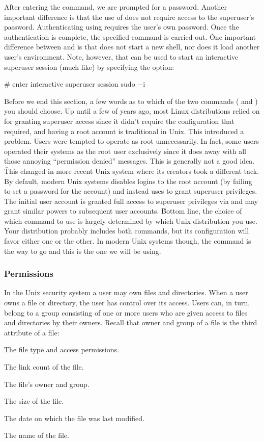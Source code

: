After entering the command, we are prompted for a password. Another important difference is that the use of  does not require access to the superuser's password. Authenticating using  requires the user's own
password. Once the authentication is complete, the specified command is carried out. \v

One important difference between  and  is that  does not start a new shell, nor does
it load another user's environment. Note, however, that  can be used to start an interactive superuser
session (much like) by specifying the  option:
\begin{bash}
# enter interactive superuser session
sudo $-$i
\end{bash}

Before we end this section, a few words as to which of the two commands ( and ) you should choose.
Up until a few of years ago, most Linux distributions relied on  for granting superuser access since it
didn't require the configuration that  required, and having a root account is traditional in Unix. This
introduced a problem. Users were tempted to operate as root unnecessarily. In fact, some users operated their systems
as the root user exclusively since it does away with all those annoying ``permission denied'' messages. This is
generally not a good idea. \v

This changed in more recent Unix system where its creators took a different tack. By default, modern Unix systems
disables logins to the root account (by failing to set a password for the account) and instead uses  to
grant superuser privileges. The initial user account is granted full access to superuser privileges via 
and may grant similar powers to subsequent user accounts. \v

Bottom line, the choice of which command to use is largely determined by which Unix distribution you use. Your
distribution probably includes both commands, but its configuration will favor either one or the other. In modern Unix
systems though, the  command is the way to go and this is the one we will be using.

\subsubsection{Permissions}

In the Unix security system a user may own files and directories. When a user owns a file or directory, the user has
control over its access. Users can, in turn, belong to a group consisting of one or more users who are given access
to files and directories by their owners. Recall that owner and group of a file is the third attribute of a file:
\bit
\item The file type and access permissions.
\item The link count of the file.
\item The file's owner and group.
\item The size of the file.
\item The date on which the file was last modified.
\item The name of the file.
\eit

